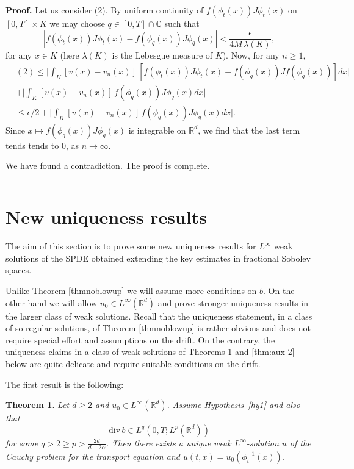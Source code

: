 \documentclass{article}
\newtheorem{theorem}{Theorem}
\newenvironment{proof}[1][Proof]{\noindent\textbf{#1.} }{\ \rule{0.5em}{0.5em}}
\begin{document}
\begin{proof}
Let us consider (2). By uniform continuity of $f(\phi_{t}( x)) J \phi_{t} (x)$ on $[0,T] \times K$ we may choose $q \in [0,T] \cap \mathbb{Q}$ such that
$$
 | f(\phi_{\hat t}(x)) J \phi_{\hat t} (x) -  f(\phi_{q
}(x)) J \phi_{q} (x) | < \frac{\epsilon } {4M \, \lambda(K)},
$$
for any $x \in K$ (here $\lambda(K)$ is the Lebesgue measure of $K$). Now, for any $n \ge 1,$
\begin{align*}
& (2) \le \Big | \int_{K } [v (x)-  v_{n} (x)] \,  [f(\phi_{\hat t} (x)) J
\phi_{\hat t} (x)- f(\phi_{q} (x)) Jf(\phi_{q} (x)) ]dx   \Big |
\\
& +   \Big | \int_{K } [v (x)-  v_{n} (x)] \,  f(\phi_{q} (x)) J
\phi_{q} (x) dx \Big |
\\
& \le \epsilon/2  + \Big | \int_{K } [v (x)-  v_{n} (x)] \,  f(\phi_{q} (x)) J
\phi_{q} (x) dx \Big |.
\end{align*}
Since $x \mapsto f(\phi_{q }(x)) J
\phi_{q} (x)$ is integrable on $\mathbb{R}^{d}$, we find that  the last term tends
tends to 0,  as $n \to\infty$.

We have found a contradiction. The proof is complete.
\end{proof}



\section{New uniqueness results}

\label{sec:fractional}

The aim of this section is to prove some new uniqueness results for
$L^{\infty}$ weak solutions of the SPDE obtained extending the key estimates
in fractional Sobolev spaces.

 Unlike  Theorem \ref{thmnoblowup} we will assume more conditions on $b$. On the other hand we will allow $u_0 \in L^{\infty}(\mathbb{R}^{d})$ and prove  stronger uniqueness results in the larger class of weak solutions.
   Recall that the uniqueness statement, in a class
of so regular solutions, of Theorem \ref{thmnoblowup} is rather obvious and does not
require special effort and assumptions on the drift. On the contrary, the
uniqueness claims in a class of weak solutions of Theorems \ref{thm:aux-1} and \ref{thm:aux-2} below
are quite delicate and require suitable conditions on the drift.

 The first result is the following:

\begin{theorem}
\label{thm:aux-1} Let $d \ge2$ and   $u_{0}\in
L^{\infty}\left( \mathbb{R}^{d}\right)  $.  Assume Hypothesis~\ref{hy1} and also that
$${\mathrm{div}\,}b\in L^{q} (0,T;L^{p}(\mathbb{R}^{d})) $$  for some $q>2 \ge p
> \frac{2d}{ d + 2 \alpha}$. Then there exists a unique weak $L^{\infty}%
$-solution $u$ of the Cauchy problem for the transport equation and
$u(t,x)=u_{0}({\phi}_{t}^{-1}( x)) $.
\end{theorem}
\end{document}
